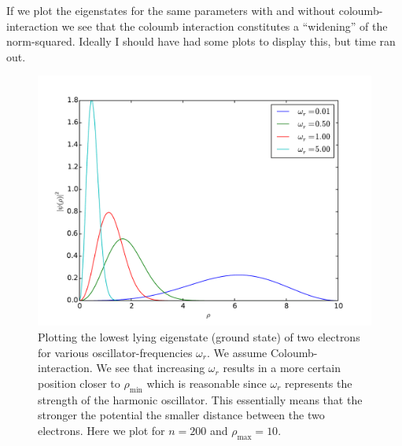 \documentclass[a4paper, 10pt]{amsart}
\begin{document}
If we plot the eigenstates for the same parameters with and without
coloumb-interaction we see that the coloumb interaction constitutes a
``widening'' of the norm-squared. Ideally I should have had some plots to
display this, but time ran out.
\begin{figure}[h!]
  \centering
  \includegraphics[width=0.6\linewidth]{./plots/schrodinger_200_10_5.pdf}
  \caption{Plotting the lowest lying eigenstate (ground state) of two electrons for various
    oscillator-frequencies $\omega_r$. We assume Coloumb-interaction. We see
    that increasing $\omega_r$ results in a more certain position closer to
    $\rho_{\textrm{min}}$ which is reasonable since $\omega_r$ represents the
    strength of the harmonic oscillator. This essentially means that the
    stronger the potential the smaller distance between the two electrons.
    Here we plot for $n = 200$ and $\rho_{\textrm{max}} = 10$.}
  \label{fig:vary_omega}
\end{figure}
\end{document}
